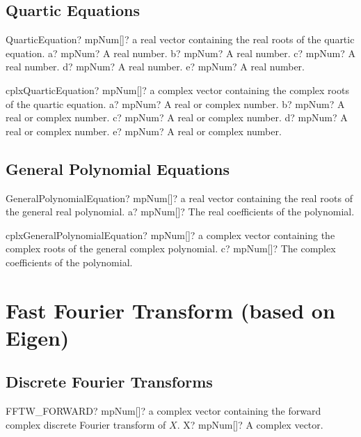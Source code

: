 \documentclass[12pt,a4paper,openany]{book}
\begin{document}
\section{Quartic Equations}

\begin{mpFunctionsExtract}
\mpFunctionFive
{QuarticEquation? mpNum[]? a real vector containing the real roots of the quartic equation.}
{a? mpNum? A real number.}
{b? mpNum? A real number.}
{c? mpNum? A real number.}
{d? mpNum? A real number.}
{e? mpNum? A real number.}
\end{mpFunctionsExtract}

\begin{mpFunctionsExtract}
\mpFunctionFive
{cplxQuarticEquation? mpNum[]? a complex vector containing the complex roots of the quartic equation.}
{a? mpNum? A real or complex number.}
{b? mpNum? A real or complex number.}
{c? mpNum? A real or complex number.}
{d? mpNum? A real or complex number.}
{e? mpNum? A real or complex number.}
\end{mpFunctionsExtract}

\section{General Polynomial Equations}

\begin{mpFunctionsExtract}
\mpFunctionOne
{GeneralPolynomialEquation? mpNum[]? a real vector containing the real roots of the general real polynomial.}
{a? mpNum[]? The real coefficients of the polynomial.}
\end{mpFunctionsExtract}

\begin{mpFunctionsExtract}
\mpFunctionOne
{cplxGeneralPolynomialEquation? mpNum[]? a complex vector containing the complex roots of the general complex polynomial.}
{c? mpNum[]? The complex coefficients of the polynomial.}
\end{mpFunctionsExtract}

\chapter{Fast Fourier Transform (based on Eigen)}

\section{Discrete Fourier Transforms}

\begin{mpFunctionsExtract}
\mpFunctionOne
{FFTW\_FORWARD? mpNum[]? a complex vector containing the forward complex discrete Fourier transform of $X$.}
{X? mpNum[]? A complex vector.}
\end{mpFunctionsExtract}
\end{document}
